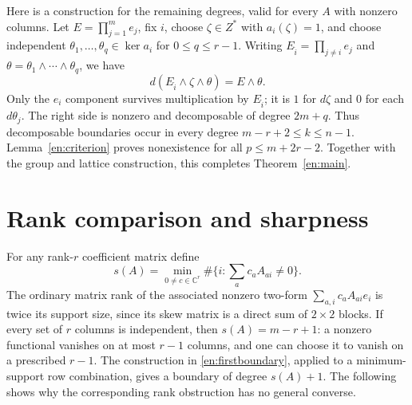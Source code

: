 \documentclass[12pt]{amsart}
\theoremstyle{definition}
\theoremstyle{remark}
\numberwithin{equation}{section}
\newcommand{\C}{\mathbb{C}}
\begin{document}
Here is a construction for the remaining degrees, valid for every $A$
with nonzero columns. Let $E=\prod_{j=1}^m e_j$, fix $i$, choose
$\zeta\in Z^*$ with $a_i(\zeta)=1$, and choose independent
$\theta_1,\ldots,\theta_q\in\ker a_i$ for $0\leq q\leq r-1$.
Writing $E_{\widehat i}=\prod_{j\ne i}e_j$ and
$\theta=\theta_1\wedge\cdots\wedge\theta_q$, we have
\begin{equation}\label{en:topboundary}
 d(E_{\widehat i}\wedge\zeta\wedge\theta)=E\wedge\theta.
\end{equation}
Only the $e_i$ component survives multiplication by $E_{\widehat i}$;
it is $1$ for $d\zeta$ and $0$ for each $d\theta_j$.
The right side is nonzero and decomposable of degree $2m+q$.
Thus decomposable boundaries occur in every degree
$m-r+2\leq k\leq n-1$. Lemma~\ref{en:criterion} proves nonexistence
for all $p\leq m+2r-2$. Together with the group and lattice construction,
this completes Theorem~\ref{en:main}.

\section{Rank comparison and sharpness}
For any rank-$r$ coefficient matrix define
\[
 s(A)=\min_{0\ne c\in\C^r}
       \#\{i:\textstyle\sum_a c_a A_{ai}\ne0\}.
\]
The ordinary matrix rank of the associated nonzero two-form
$\sum_{a,i}c_aA_{ai}e_i$ is twice its support size, since its skew matrix
is a direct sum of $2\times2$ blocks. If every set of $r$ columns is
independent, then $s(A)=m-r+1$: a nonzero functional vanishes on at most
$r-1$ columns, and one can choose it to vanish on a prescribed $r-1$.
The construction in \eqref{en:firstboundary}, applied to a minimum-support
row combination, gives a boundary of degree $s(A)+1$.
The following shows why the corresponding rank obstruction has no
general converse.
\end{document}
